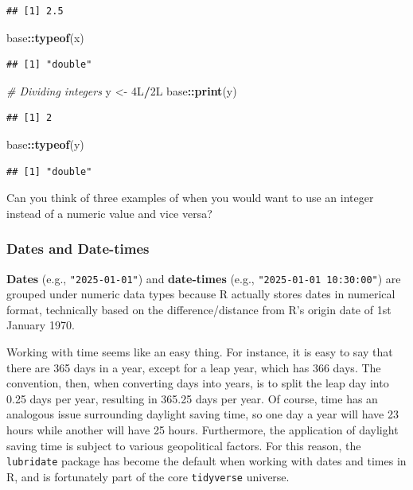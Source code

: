 \documentclass[
]{book}
\newenvironment{Shaded}{\begin{snugshade}}{\end{snugshade}}
\newcommand{\CommentTok}[1]{\textcolor[rgb]{0.56,0.35,0.01}{\textit{#1}}}
\newcommand{\DataTypeTok}[1]{\textcolor[rgb]{0.13,0.29,0.53}{#1}}
\newcommand{\DecValTok}[1]{\textcolor[rgb]{0.00,0.00,0.81}{#1}}
\newcommand{\FunctionTok}[1]{\textcolor[rgb]{0.13,0.29,0.53}{\textbf{#1}}}
\newcommand{\NormalTok}[1]{#1}
\newcommand{\OtherTok}[1]{\textcolor[rgb]{0.56,0.35,0.01}{#1}}
\newcommand{\SpecialCharTok}[1]{\textcolor[rgb]{0.81,0.36,0.00}{\textbf{#1}}}
\begin{document}
\begin{verbatim}
## [1] 2.5
\end{verbatim}

\begin{Shaded}
\begin{Highlighting}[]
\NormalTok{base}\SpecialCharTok{::}\FunctionTok{typeof}\NormalTok{(x)}
\end{Highlighting}
\end{Shaded}

\begin{verbatim}
## [1] "double"
\end{verbatim}

\begin{Shaded}
\begin{Highlighting}[]
\CommentTok{\# Dividing integers }
\NormalTok{y }\OtherTok{\textless{}{-}} \DecValTok{4}\DataTypeTok{L}\SpecialCharTok{/}\DecValTok{2}\DataTypeTok{L}
\NormalTok{base}\SpecialCharTok{::}\FunctionTok{print}\NormalTok{(y)}
\end{Highlighting}
\end{Shaded}

\begin{verbatim}
## [1] 2
\end{verbatim}

\begin{Shaded}
\begin{Highlighting}[]
\NormalTok{base}\SpecialCharTok{::}\FunctionTok{typeof}\NormalTok{(y)}
\end{Highlighting}
\end{Shaded}

\begin{verbatim}
## [1] "double"
\end{verbatim}

Can you think of three examples of when you would want to use an integer instead of a numeric value and vice versa?

\subsubsection{Dates and Date-times}\label{sec:datesAndTimes}

\textbf{Dates} (e.g., \texttt{"2025-01-01"}) and \textbf{date-times} (e.g., \texttt{"2025-01-01\ 10:30:00"}) are grouped under numeric data types because R actually stores dates in numerical format, technically based on the difference/distance from R's origin date of 1st January 1970.

Working with time seems like an easy thing. For instance, it is easy to say that there are 365 days in a year, except for a leap year, which has 366 days. The convention, then, when converting days into years, is to split the leap day into 0.25 days per year, resulting in 365.25 days per year. Of course, time has an analogous issue surrounding daylight saving time, so one day a year will have 23 hours while another will have 25 hours. Furthermore, the application of daylight saving time is subject to various geopolitical factors. For this reason, the \texttt{lubridate} package has become the default when working with dates and times in R, and is fortunately part of the core \texttt{tidyverse} universe.
\end{document}
